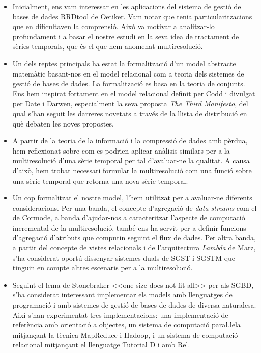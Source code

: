 \documentclass{scrartcl}
\begin{document}
\begin{itemize}
\item Inicialment, ens vam interessar en les aplicacions del sistema
  de gestió de bases de dades RRDtool de Oetiker. Vam notar que tenia
  particularitzacions que en dificultaven la comprensió.  Això va
  motivar a analitzar-lo profundament i a basar el nostre estudi en la
  seva idea de tractament de sèries temporals, que és el que hem
  anomenat multiresolució.


\item Un dels reptes principals ha estat la formalització d'un model
  abstracte matemàtic basant-nos en el model relacional com a teoria
  dels sistemes de gestió de bases de dades. La formalització es basa
  en la teoria de conjunts. Ens hem inspirat fortament en el model
  relacional definit per Codd i divulgat per Date i Darwen,
  especialment la seva proposta \emph{The Third Manifesto}, del qual
  s'han seguit les darreres novetats a través de la llista de
  distribució en què debaten les noves propostes.

\item A partir de la teoria de la informació i la compressió de dades
  amb pèrdua, hem reflexionat sobre com es podrien aplicar anàlisis similars
  per a la multiresolució d'una sèrie temporal per tal d'avaluar-ne la
  qualitat. A causa d'això, hem trobat necessari formular la
  multiresolució com una funció sobre una sèrie temporal que retorna
  una nova sèrie temporal.

\item Un cop formalitzat el nostre model, l'hem utilitzat per a
  avaluar-ne diferents consideracions. Per una banda, el concepte
  d'agregació de \emph{data streams} com el de Cormode, a banda
  d'ajudar-nos a caracteritzar l'aspecte de computació incremental de
  la multiresolució, també ens ha servit per a definir funcions
  d'agregació d'atributs que computin seguint el flux de dades.  Per
  altra banda, a partir del concepte de vistes relacionals i de
  l'arquitectura \emph{Lambda} de Marz, s'ha considerat oportú dissenyar
  sistemes duals de SGST i SGSTM que tinguin en compte altres
  escenaris per a la multiresolució.

\item Seguint el lema de Stonebraker <<one size does not fit all>> per
  als SGBD, s'ha considerat interessant implementar els models amb
  llenguatges de programació i amb sistemes de gestió de bases de
  dades de diversa naturalesa. Així s'han experimentat tres
  implementacions: una implementació de referència amb orientació a
  objectes, un sistema de computació para\l.lela mitjançant la tècnica
  MapReduce i Hadoop, i un sistema de computació relacional mitjançant
  el llenguatge Tutorial D i amb Rel.




\end{itemize}
\end{document}
